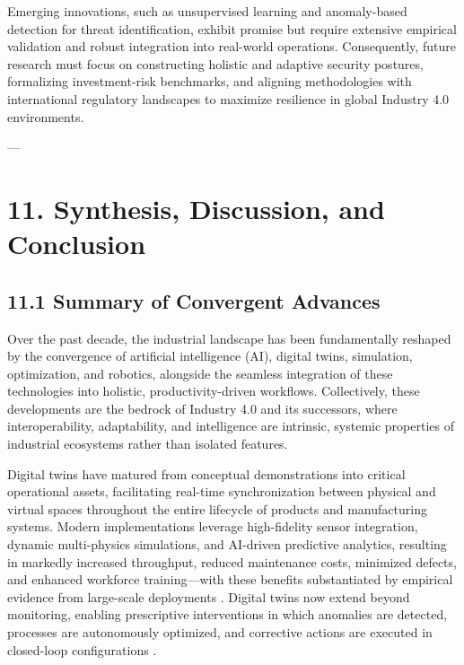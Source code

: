 \documentclass[11pt]{article}
\begin{document}
Emerging innovations, such as unsupervised learning and anomaly-based detection for threat identification, exhibit promise but require extensive empirical validation and robust integration into real-world operations. Consequently, future research must focus on constructing holistic and adaptive security postures, formalizing investment-risk benchmarks, and aligning methodologies with international regulatory landscapes to maximize resilience in global Industry 4.0 environments.

---

\section{11. Synthesis, Discussion, and Conclusion}

\subsection{11.1 Summary of Convergent Advances}

Over the past decade, the industrial landscape has been fundamentally reshaped by the convergence of artificial intelligence (AI), digital twins, simulation, optimization, and robotics, alongside the seamless integration of these technologies into holistic, productivity-driven workflows. Collectively, these developments are the bedrock of Industry 4.0 and its successors, where interoperability, adaptability, and intelligence are intrinsic, systemic properties of industrial ecosystems rather than isolated features.

Digital twins have matured from conceptual demonstrations into critical operational assets, facilitating real-time synchronization between physical and virtual spaces throughout the entire lifecycle of products and manufacturing systems. Modern implementations leverage high-fidelity sensor integration, dynamic multi-physics simulations, and AI-driven predictive analytics, resulting in markedly increased throughput, reduced maintenance costs, minimized defects, and enhanced workforce training—with these benefits substantiated by empirical evidence from large-scale deployments \cite{ref38}. Digital twins now extend beyond monitoring, enabling prescriptive interventions in which anomalies are detected, processes are autonomously optimized, and corrective actions are executed in closed-loop configurations \cite{ref41}\cite{ref43}.
\end{document}
